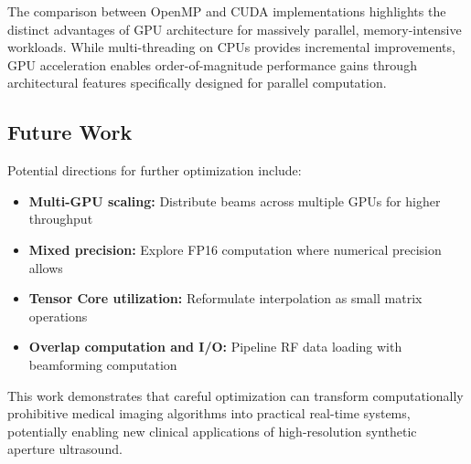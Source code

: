 \documentclass{article}
\begin{document}
The comparison between OpenMP and CUDA implementations highlights the distinct advantages of GPU architecture for massively parallel, memory-intensive workloads. While multi-threading on CPUs provides incremental improvements, GPU acceleration enables order-of-magnitude performance gains through architectural features specifically designed for parallel computation.

\subsection{Future Work}

Potential directions for further optimization include:
\begin{itemize}
    \item \textbf{Multi-GPU scaling:} Distribute beams across multiple GPUs for higher throughput
    \item \textbf{Mixed precision:} Explore FP16 computation where numerical precision allows
    \item \textbf{Tensor Core utilization:} Reformulate interpolation as small matrix operations
    \item \textbf{Overlap computation and I/O:} Pipeline RF data loading with beamforming computation
\end{itemize}

This work demonstrates that careful optimization can transform computationally prohibitive medical imaging algorithms into practical real-time systems, potentially enabling new clinical applications of high-resolution synthetic aperture ultrasound.



\end{document}
